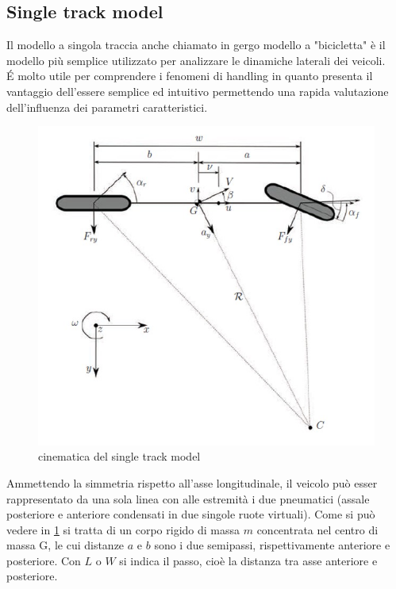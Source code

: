\subsection{Single track model}
Il modello a singola traccia anche chiamato in gergo modello a "bicicletta" è il modello più semplice utilizzato per analizzare le dinamiche laterali dei veicoli.\\
\'E molto utile per comprendere i fenomeni di handling in quanto presenta il vantaggio dell'essere semplice ed intuitivo permettendo una rapida valutazione dell'influenza dei parametri caratteristici.\\
\begin{figure}[!h]
    \centering
    \includegraphics[scale=0.7]{Immagini/Tyres/Single_track_model.jpg}
    \caption{cinematica del single track model}
    \label{fig:Single track model}
\end{figure}
Ammettendo la simmetria rispetto all’asse longitudinale,
il veicolo può esser rappresentato da una sola linea con alle estremità i due
pneumatici (assale posteriore e anteriore condensati in due singole ruote virtuali). Come si può vedere in \ref{fig:Single track model} si tratta di un corpo rigido di massa
$m$ concentrata nel centro di massa G, le cui distanze $a$ e $b$ sono i due semipassi,
rispettivamente anteriore e posteriore. Con $L$ o $W$ si indica il passo, cioè la distanza tra asse anteriore e posteriore.\\
